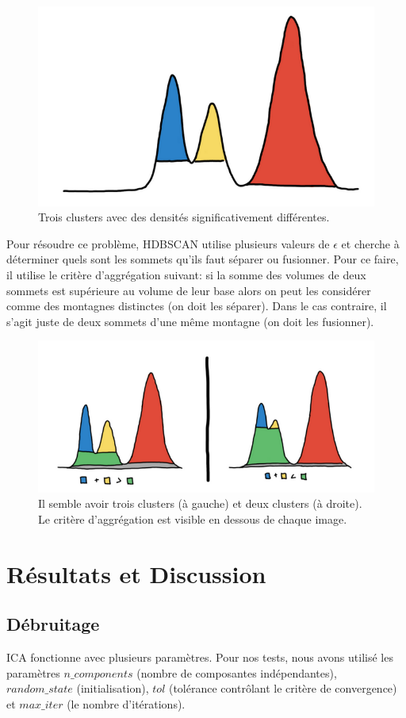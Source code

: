 \documentclass[11pt, openany]{report}
\begin{document}
\begin{figure}[H]
  \centering
  \includegraphics[width=0.6\linewidth]{vary_desity.png}
  \caption{Trois clusters avec des densités significativement différentes.}
\end{figure}
Pour résoudre ce problème, HDBSCAN utilise plusieurs valeurs de $\epsilon$ et cherche à déterminer quels sont les sommets qu'ils faut séparer ou fusionner. Pour ce faire, il utilise le critère d'aggrégation suivant:
si la somme des volumes de deux sommets est supérieure au volume de leur base alors on peut les considérer comme des montagnes distinctes (on doit les séparer). Dans le cas contraire, il s'agit juste de deux sommets d'une même montagne (on doit les fusionner).

\begin{figure}[H]
  \centering
  \includegraphics[width=0.6\linewidth]{heuristic.png}
  \caption{Il semble avoir trois clusters (à gauche) et deux clusters (à droite). Le critère d'aggrégation est visible en dessous de chaque image.}
\end{figure}

\chapter{Résultats et Discussion}
\section{Débruitage}
ICA fonctionne avec plusieurs paramètres. Pour nos tests, nous avons utilisé les paramètres $n\_components$ (nombre de composantes indépendantes), $random\_state$ (initialisation), $tol$ (tolérance contrôlant le critère de convergence) et $max\_iter$ (le nombre d’itérations).
\end{document}
